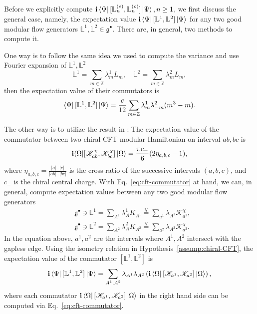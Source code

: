 \documentclass[12pt, nofootinbib]{article}
\theoremstyle{plain}
\theoremstyle{assumption}
\theoremstyle{definition}
\theoremstyle{plain}
\theoremstyle{plain}
\theoremstyle{plain}
\theoremstyle{plain}
\theoremstyle{plain}
\def\veq{\stackrel{\mathbb{V}}{=}}
\def\Lb{\mathbb{L}}
\def\Lbe{\mathbb{L}^{(e)}}
\def\Lbo{\mathbb{L}^{(o)}}
\def\Kcft{\mathscr{K}}
\def\gc{\mathfrak{g}^{\bullet}}
\begin{document}
Before we explicitly compute $\ii \bra{\Psi}[\Lbe_n,\Lbo_{n}]\ket{\Psi},n\geq 1$, we first discuss the general case, namely, the expectation value $\ii \bra{\Psi} [\Lb^1,\Lb^2] \ket{\Psi}$ for any two good modular flow generators $\Lb^1,\Lb^2 \in \gc$. There are, in general, two methods to compute it. 

One way is to follow the same idea we used to compute the variance and use Fourier expansion of $\Lb^1,\Lb^2$ 
\begin{equation}
    \Lb^1 = \sum_{m\in\mathbb{Z}} \lambda^1_m L_m,\quad \Lb^2 = \sum_{m\in\mathbb{Z}} \lambda^2_m L_m,
\end{equation}
then the expectation value of their commutators is 
\begin{equation}
     \bra{\Psi}[\Lb^1,\Lb^2]\ket{\Psi} = \frac{c}{12}\sum_{m\in\mathbb{Z}} \lambda_m^1 \lambda_{-m}^2 (m^3-m). 
\end{equation}

The other way is to utilize the result in \cite{Zou2022}: The expectation value of the commutator between two chiral CFT modular Hamiltonian on interval $ab,bc$ is 
\begin{equation}\label{eq:cft-commutator}
    \ii{\bra{\Omega}} [ \Kcft_{ab}^{\chi}, \Kcft_{bc}^{\chi}]\ket{\Omega} = \frac{\pi c_{-}}{6}(2\eta_{a,b,c}-1), 
\end{equation}
where $\eta_{a,b,c} = \frac{|a|\cdot|c|}{|ab|\cdot |bc|}$ is the cross-ratio of the successive intervals $(a,b,c)$, and $c_{-}$ is the chiral central charge. With Eq.~\eqref{eq:cft-commutator} at hand, we can, in general, compute expectation values between any two good modular flow generators
\begin{equation}
    \begin{aligned}
        &\gc \ni \Lb^1 = \sum_{A^1} \lambda_A^1 K_{A^1} \veq \sum_{a^1} \lambda_{A^1}\Kcft^{\chi}_{a^1},\\ 
        &\gc \ni \Lb^2 = \sum_{A^2} \lambda_A^2 K_{A^2} \veq \sum_{a^2} \lambda_{A^2}\Kcft^{\chi}_{a^2}.
    \end{aligned}
\end{equation}
In the equation above, $a^1,a^2$ are the intervals where $A^1,A^2$ intersect with the gapless edge. Using the isometry relation in Hypothesis~\ref{assump:chiral-CFT}, the expectation value of the commutator $[\Lb^1,\Lb^2]$ is  
\begin{equation}
    \ii \bra{\Psi} [\Lb^1,\Lb^2] \ket{\Psi} = \sum_{A^1,A^2}\lambda_{A^1}\lambda_{A^2} \left( \ii \bra{\Omega}[\Kcft_{a^1},\Kcft_{a^2}]\ket{\Omega}\right),
\end{equation}
where each commutator $\ii \bra{\Omega}[\Kcft_{a^1},\Kcft_{a^2}]\ket{\Omega}$ in the right hand side can be computed via Eq.~\eqref{eq:cft-commutator}. 
\end{document}
